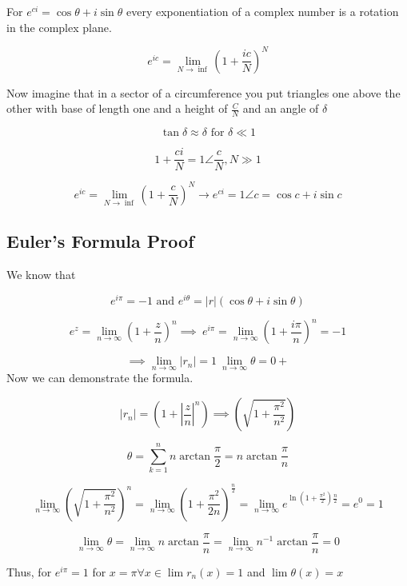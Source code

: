 For  \(e^{ci} = \cos{\theta} + i\sin{\theta}\) every exponentiation of a complex number is a rotation 
in the complex plane.

\[
	e^{ic} = \lim_{N \to \inf} {\left( 1 + \frac{ic}{N}\right)}^N
\]

Now imagine that in a sector of a circumference you put triangles one above the other with base of 
length one and a height of \(\frac{C}{N}\) and 
an angle of \(\delta\)

\[
	\tan{\delta} \approx \delta \text{ for } \delta \ll 1
\]

\[
	1 + \frac{ci}{N} = 1 \angle \frac{c}{N}, N \gg 1
\]

\[
	e^{ic} = \lim_{N \to \inf} {\left( 1 + \frac{c}{N}\right)}^N \to e^{ci} = 1 \angle c = \cos{c} + 
	i\sin{c}
\]

\subsection{Euler's Formula Proof}

We know that

\[
	e^{i\pi} = -1 \text{ and } e^{i\theta} = |r|(\cos{\theta} + i\sin{\theta})
\]

\[
	e^{z} = \lim_{n \to \infty} {\left( 1 + \frac{z}{n}\right)}^n \implies\ e^{i\pi} = 
	\lim_{n \to \infty} {\left( 1 + \frac{i\pi}{n}\right)}^n = -1
\]

\[
	\implies \lim_{n \to \infty} |r_n| = 1\ \lim_{n \to \infty} \theta = 0+
\]
 Now we can demonstrate the formula.

\[
	|r_n| = \left( 1 + \left|\frac{z}{n}\right|^n \right) \implies 
	\left( \sqrt{1 + \frac{\pi^2}{n^2}}\right)
\]

\[
	\theta = \sum_{k = 1}^{n} n \arctan \frac{\pi}{2} = n \arctan \frac{\pi}{n}
\]

\[
	\lim_{n \to \infty} {\left( \sqrt{1 + \frac{\pi^2}{n^2}}\right)}^n = \lim_{n \to \infty} 
	{\left( 1 + \frac{\pi^2}{2n} \right) }^{\frac{n}{2}}
	= \lim_{n \to \infty} e^{\ln\left(1 +\frac{\pi^2}{2}\right) \frac{n}{2}} = e^0 = 1
\]

\[
	\lim_{n \to \infty} \theta = \lim_{n \to \infty} n \arctan \frac{\pi}{n} = \lim_{n \to \infty} 
	n^{-1} \arctan\frac{\pi}{n} = 0
\]

Thus, for \(e^{i\pi} = 1\) for \(x = \pi \forall x \in \lim r_n (x) = 1\) and \( \lim \theta (x) = x\)

\QED
